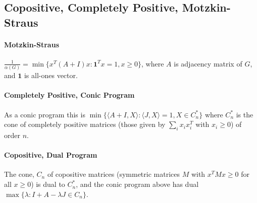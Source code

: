 \documentclass[letterpaper,11pt,oneside,onecolumn]{article}
\begin{document}
\subsection*{Copositive, Completely Positive, Motzkin-Straus}
\paragraph{Motzkin-Straus} $\frac{1}{\alpha(G)} = \min\{x^T(A+I)x : \textbf{1}^Tx = 1, x\geq 0\}$, where $A$ is adjacency matrix of $G$, and $\textbf{1}$ is all-ones vector.
\paragraph{Completely Positive, Conic Program} As a conic program this is $\min\{\langle A+I, X\rangle : \langle J, X\rangle = 1, X \in C_n^*\}$ where $C_n^*$ is the cone of completely positive matrices (those given by $\sum_i x_i x_i^T$ with $x_i \geq 0$) of order $n$. 
\paragraph{Copositive, Dual Program} The cone, $C_n$ of copositive matrices (symmetric matrices $M$ with $x^TMx \geq 0$ for all $x \geq 0$) is dual to $C_n^*$, and the conic program above has dual $\max\{\lambda : I + A -\lambda J \in C_n \}$.
\end{document}
